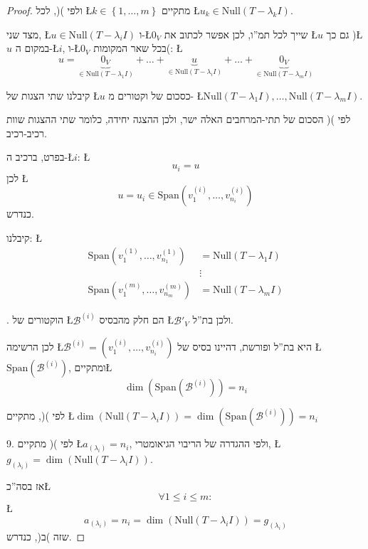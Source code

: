\documentclass[english,hebrew]{article}
\begin{document}
\begin{proof}
ולפי ){\endL}(, לכל \L{$k\in\left\{ 1,\dots,m\right\} $}
מתקיים \L{$u_{k}\in\text{Null}(T-\lambda_{k}I)$}.

מצד שני, \L{$u\in\text{Null}(T-\lambda_{i}I)$} ו-\L{$0_{V}$} שייך
לכל תמ\textquotedblright ו, לכן אפשר לכתוב את \L{$u$} גם כך )\L{$u$}
במקום ה-\L{$i$}, ו-\L{$0_{V}$} בכל שאר המקומות(: \L{%
\[
u=\underbrace{0_{V}}_{\in\text{Null}(T-\lambda_{1}I)}+\dots+\underbrace{u}_{\in\text{Null}(T-\lambda_{i}I)}+\dots+\underbrace{0_{V}}_{\in\text{Null}(T-\lambda_{m}I)}
\]
}%

קיבלנו שתי הצגות של \L{$u$} כסכום של וקטורים מ- \L{$\text{Null}(T-\lambda_{1}I),\dots,\text{Null}(T-\lambda_{m}I)$}.

לפי ){\endL}( הסכום של תתי-המרחבים האלה ישר, ולכן ההצגה יחידה,
כלומר שתי ההצגות שוות רכיב-רכיב.

בפרט, ברכיב ה-\L{$i$}: \L{%
\[
u_{i}=u
\]
}%
לכן \L{%
\[
u=u_{i}\in\text{Span}\left(v_{1}^{(i)},\dots,v_{n_{i}}^{(i)}\right)
\]
}%
כנדרש.

קיבלנו: \L{%
\begin{align*}
\text{Span}\left(v_{1}^{(1)},\dots,v_{n_{1}}^{(1)}\right) & =\text{Null}(T-\lambda_{1}I)\\
 & \vdots\\
\text{Span}\left(v_{1}^{(m)},\dots,v_{n_{m}}^{(m)}\right) & =\text{Null}(T-\lambda_{m}I)
\end{align*}
}%

{\endL}. הוקטורים של \L{$\mathcal{B}^{(i)}$} הם חלק מהבסיס
\L{$\mathcal{B}'_{V}$} ולכן בת\textquotedblright ל.

לכן הרשימה \L{$\mathcal{B}^{(i)}=\left(v_{1}^{(i)},\dots,v_{n_{i}}^{(i)}\right)$}
היא בת\textquotedblright ל ופורשת, דהיינו בסיס של \L{$\text{Span}\left(\mathcal{B}^{(i)}\right)$},
ומתקיים\L{%
\[
\dim\left(\text{Span}\left(\mathcal{B}^{(i)}\right)\right)=n_{i}
\]
}%

לפי ){\endL}(, מתקיים \L{$\dim\left(\text{Null}(T-\lambda_{i}I)\right)=\dim\left(\text{Span}\left(\mathcal{B}^{(i)}\right)\right)=n_{i}$}

9. לפי ){\endL}( מתקיים \L{$a_{(\lambda_{i})}=n_{i}$}, ולפי
ההגדרה של הריבוי הגיאומטרי, \L{$g_{(\lambda_{i})}=\dim\left(\text{Null}(T-\lambda_{i}I)\right)$}.

אז בסה\textquotedblright כ\L{%
\[
\forall1\le i\le m:
\]
}%
\L{%
\[
a_{(\lambda_{i})}=n_{i}=\dim\left(\text{Null}(T-\lambda_{i}I)\right)=g_{(\lambda_{i})}
\]
}%
שזה )ב(, כנדרש.
\end{proof}
\end{document}

